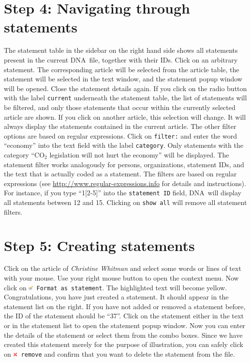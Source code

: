 \documentclass[12pt,a4paper]{scrreprt}
\newcommand{\dnashort}{\textsc{DNA}}
\newcommand{\code}[1]{\texttt{#1}}
\begin{document}
\section*{Step 4: Navigating through statements}
The statement table in the sidebar on the right hand side shows all statements present in the current \dnashort\ file, together with their IDs. Click on an arbitrary statement. The corresponding article will be selected from the article table, the statement will be selected in the text window, and the statement popup window will be opened. Close the statement details again. If you click on the radio button with the label \code{current} underneath the statement table, the list of statements will be filtered, and only those statements that occur within the currently selected article are shown. If you click on another article, this selection will change. It will always display the statements contained in the current article. The other filter options are based on regular expressions. Click on \code{filter:} and enter the word ``economy'' into the text field with the label \code{category}. Only statements with the category ``CO$_2$ legislation will not hurt the economy'' will be displayed. The statement filter works analogously for persons, organizations, statement IDs, and the text that is actually coded as a statement. The filters are based on regular expressions (see \url{http://www.regular-expressions.info} for details and instructions). For instance, if you type ``1[2-5]'' into the \code{statement ID} field, \dnashort\ will display all statements between 12 and 15. Clicking on \code{show all} will remove all statement filters.

\section*{Step 5: Creating statements}
Click on the article of \emph{Christine Whitman} and select some words or lines of text with your mouse. Use your right mouse button to open the context menu. Now click on \code{\includegraphics[height=9px]{icons-edit.png} Format as statement}. The highlighted text will become yellow. Congratulations, you have just created a statement. It should appear in the statement list on the right. If you have not added or removed a statement before, the ID of the statement should be ``37''. Click on the statement either in the text or in the statement list to open the statement popup window. Now you can enter the details of the statement or select them from the combo boxes. Since we have created this statement merely for the purpose of illustration, you can safely click on \code{\includegraphics[height=9px]{icons-remove.png} remove} and confirm that you want to delete the statement from the file.
 
\end{document}

